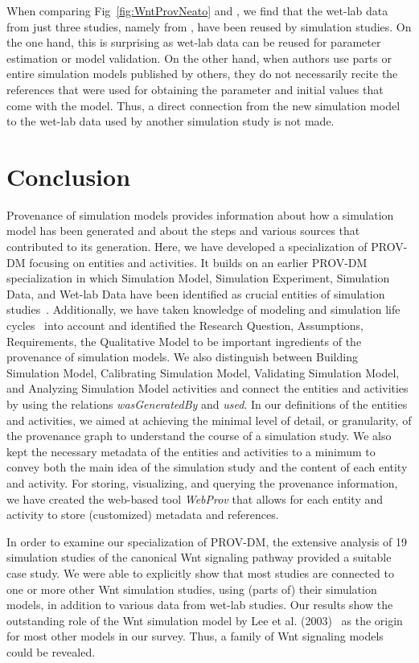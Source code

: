 \documentclass[10pt,letterpaper]{article}
\newcommand{\webprov}{\textit{WebProv}}
\newcommand{\wnt}{Wnt}
\newcommand{\lee}{Lee et al. (2003)}
\newcommand{\RQ}{Research Question}
\newcommand{\As}{Assumptions}
\newcommand{\Rs}{Requirements}
\newcommand{\QM}{Qualitative Model}
\newcommand{\SM}{Simulation Model}
\newcommand{\SE}{Simulation Experiment}
\newcommand{\SD}{Simulation Data}
\newcommand{\WD}{Wet-lab Data}
\newcommand{\BSM}{Building Simulation Model}
\newcommand{\CSM}{Calibrating Simulation Model}
\newcommand{\VSM}{Validating Simulation Model}
\newcommand{\ASM}{Analyzing Simulation Model}
\begin{document}
When comparing Fig~\ref{fig:WntProvNeato} and , we find that the wet-lab data from just three studies, namely from \cite{Bafico2001, Hannoush2008, Dequeant2006}, have been reused by simulation studies.
On the one hand, this is surprising as wet-lab data can be reused for parameter estimation or model validation.
On the other hand, when authors use parts or entire simulation models published by others, they do not necessarily recite the references that were used for obtaining the parameter and initial values that come with the model.
Thus, a direct connection from the new simulation model to the wet-lab data used by another simulation study is not made.



\section*{Conclusion}

Provenance of simulation models provides information about how a simulation model has been generated and about the steps and various sources that contributed to its generation.
Here, we have developed a specialization of PROV-DM focusing on entities and activities.
It builds on an earlier PROV-DM specialization in which \SM{}, \SE{}, \SD{}, and \WD{} have been identified as crucial entities of simulation studies~\cite{Ruscheinski2018}.
Additionally, we have taken knowledge of modeling and simulation life cycles~\cite{Balci2012} into account and identified the \RQ{}, \As{}, \Rs{}, the \QM{} to be important ingredients of the provenance of simulation models.
We also distinguish between \BSM{}, \CSM{}, \VSM{}, and \ASM{} activities and connect the entities and activities by using the relations \textit{wasGeneratedBy} and \textit{used}.
In our definitions of the entities and activities, we aimed at achieving the minimal level of detail, or granularity, of the provenance graph to understand the course of a simulation study.
We also kept the necessary metadata of the entities and activities to a minimum to convey both the main idea of the simulation study and the content of each entity and activity.
For storing, visualizing, and querying the provenance information, we have created the web-based tool \webprov{} that allows for each entity and activity to store (customized) metadata and references.

In order to examine our specialization of PROV-DM, the extensive analysis of 19 simulation studies of the canonical \wnt{} signaling pathway provided a suitable case study.
We were able to explicitly show that most studies are connected to one or more other \wnt{} simulation studies, using (parts of) their simulation models, in addition to various data from wet-lab studies.
Our results show the outstanding role of the \wnt{} simulation model by \lee{}~\cite{Lee2003} as the origin for most other models in our survey.
Thus, a family of \wnt{} signaling models could be revealed.
\end{document}
